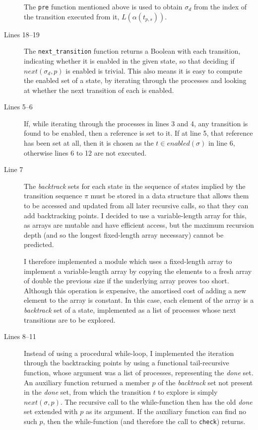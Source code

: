 \documentclass[12pt,a4paper,twoside,openright]{report}
\begin{document}
\begin{description}
	The \texttt{pre} function mentioned above is used to
	obtain $\sigma_d$ from the index of the
	transition executed from it, $L(\alpha(t_{p,s}))$.

	\item[Lines 18--19]	The \texttt{next\_transition} function
	returns a Boolean with each transition, indicating whether
	it is enabled in the given state, so that deciding if
	$\textit{next}(\sigma_d,p)$ is enabled is trivial.
	This also
	means it is easy to compute the enabled
	set of a state, by iterating through the processes
	and looking at whether the next transition of each
	is enabled.

	\item[Lines 5--6] If, while iterating through the
	processes in lines 3 and 4, any transition is found to be
	enabled, then a reference is set to it. If at line 5,
	that reference has been set at all, then it is chosen
	as the $t \in \textit{enabled}(\sigma)$ in line 6,
	otherwise lines 6 to 12 are not executed.

	\item[Line 7] The \textit{backtrack} sets for each state
	in the sequence of states implied by the transition
	sequence $\pi$ must be stored in a data structure that
	allows them to be accessed and updated from all later
	recursive calls, so that they can add backtracking
	points. I decided to use a variable-length array
	for this, as arrays are mutable and have efficient
	access, but the maximum recursion depth (and so the
	longest fixed-length array necessary) cannot be predicted.
	
	I therefore implemented a module which uses a fixed-length
	array to implement a variable-length array by
	copying the elements to a fresh array of double the
	previous size if the underlying array proves too short.
	Although this operation is expensive, the amortised
	cost of adding a new element to the array is constant.
	In this case, each element of the array is a \textit{backtrack}
	set of a state, implemented as a list of processes
	whose next transitions are to be explored.
	
	\item[Lines 8--11] Instead of using a
	procedural while-loop,
	I implemented the iteration through
	the backtracking points
	by using a functional tail-recursive
	function, whose argument
	was a list of processes, representing
	the \textit{done} set. An auxiliary
	function returned a member $p$ of the
	\textit{backtrack} set not present in the
	\textit{done} set, from which the
	transition $t$ to explore is simply
	$\textit{next}(\sigma, p)$. The
	recursive call to the while-function
	then has the old \textit{done} set
	extended with $p$ as its argument. If
	the auxiliary function can
	find no such $p$, then the
	while-function (and therefore the
	call to \texttt{check}) returns.


\end{description}
\end{document}
